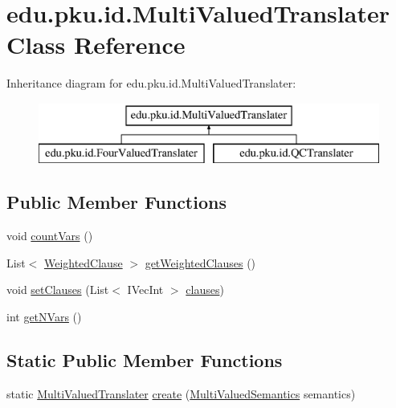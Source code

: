 \hypertarget{classedu_1_1pku_1_1id_1_1_multi_valued_translater}{
\section{edu.pku.id.MultiValuedTranslater Class Reference}
\label{classedu_1_1pku_1_1id_1_1_multi_valued_translater}
}
Inheritance diagram for edu.pku.id.MultiValuedTranslater:\begin{figure}[H]
\begin{center}
\leavevmode
\includegraphics[height=2.000000cm]{classedu_1_1pku_1_1id_1_1_multi_valued_translater}
\end{center}
\end{figure}
\subsection*{Public Member Functions}
\begin{DoxyCompactItemize}
\item 
void \hyperlink{classedu_1_1pku_1_1id_1_1_multi_valued_translater_a04258517c65ce4b3463294ea4c78b74b}{countVars} ()
\item 
List$<$ \hyperlink{classedu_1_1pku_1_1id_1_1_weighted_clause}{WeightedClause} $>$ \hyperlink{classedu_1_1pku_1_1id_1_1_multi_valued_translater_ac5c20fd88b29e9df2837e711bf236c11}{getWeightedClauses} ()
\item 
void \hyperlink{classedu_1_1pku_1_1id_1_1_multi_valued_translater_a5f20e760fdc78e31ea00770274b0b3a6}{setClauses} (List$<$ IVecInt $>$ \hyperlink{classedu_1_1pku_1_1id_1_1_multi_valued_translater_ac5e73cd4928c489b13949689250bdd33}{clauses})
\item 
int \hyperlink{classedu_1_1pku_1_1id_1_1_multi_valued_translater_ae2bc7bb42344c252fa310e0a27928fb8}{getNVars} ()
\end{DoxyCompactItemize}
\subsection*{Static Public Member Functions}
\begin{DoxyCompactItemize}
\item 
static \hyperlink{classedu_1_1pku_1_1id_1_1_multi_valued_translater}{MultiValuedTranslater} \hyperlink{classedu_1_1pku_1_1id_1_1_multi_valued_translater_a966c7a4cf64060a6417f811eba77775d}{create} (\hyperlink{namespaceedu_1_1pku_1_1id_ad71ddcb0be4b31cdeeb2a5d755309f2d}{MultiValuedSemantics} semantics)
\end{DoxyCompactItemize}
